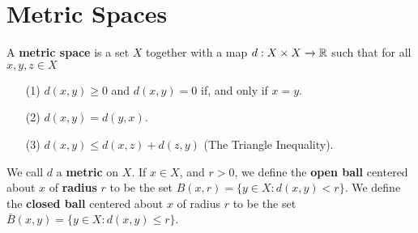 \section{Metric Spaces}

\begin{definition}
    A \textbf{metric space} is a set $X$ together with a map  $d:X \times X
    \xrightarrow{} \mathbb{R}$ such that for all $x,y,z \in X$
    \begin{enumerate}
        \item[(1)] $d(x,y) \geq 0$ and $d(x,y)=0$ if, and only if $x=y$.

        \item[(2)] $d(x,y)=d(y,x)$.

        \item[(3)] $d(x,y) \leq d(x,z)+d(z,y)$ (The Triangle Inequality).
    \end{enumerate}
    We call $d$ a  \textbf{metric} on $X$. If  $x \in X$, and  $r>0$, we define
    the  \textbf{open ball} centered about $x$ of  \textbf{radius} $r$ to be the
    set  $B(x,r)=\{y \in X : d(x,y)<r\}$. We define the \textbf{closed ball}
    centered about $x$ of radius  $r$ to be the set  $\bar{B}(x,y)=\{y \in X :
    d(x,y) \leq r\}$.
\end{definition}


